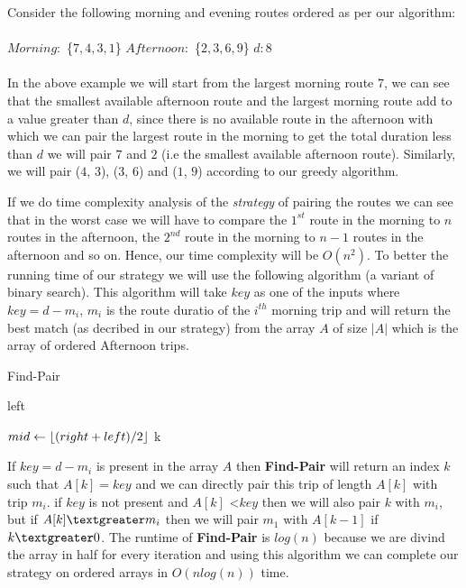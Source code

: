 \documentclass[8pt]{article}
\DeclarePairedDelimiter\floor{\lfloor}{\rfloor}
\begin{document}
Consider the following morning and evening routes ordered as per our algorithm: \\ \\
$Morning:$ \{$7,4,3,1$\} $Afternoon:$ \{$2,3,6,9$\} $d:8$ \\ \\
In the above example we will start from the largest morning route $7$, we can see that the smallest available afternoon route and the largest morning route add to a value greater than $d$, since there is no available route in the afternoon with which we can pair the largest route in the morning to get the total duration less than $d$ we will pair $7$ and $2$ (i.e the smallest available afternoon route). Similarly, we will pair ($4$, $3$), ($3$, $6$) and ($1$, $9$) according to our greedy algorithm.

If we do time complexity analysis of the \textit{strategy} of pairing the routes we can see that in the worst case we will have to compare the $1^{st}$ route in the morning to $n$ routes in the afternoon, the $2^{nd}$ route in the morning to $n - 1$ routes in the afternoon and so on. Hence, our time complexity will be $O(n^2)$. To better the running time of our strategy we will use the following algorithm (a variant of binary search). This algorithm will take $key$ as one of the inputs where $key = d - m_i$, $m_i$ is the route duratio of the $i^{th}$ morning trip and will return the best match (as decribed in our strategy) from the array $A$ of size $\left\vert{A}\right\vert$ which is the array of ordered Afternoon trips.

\begin{algorithm}
\caption{Find-Pair}\label{euclid}
\begin{algorithmic}[1]

    \Return left
\EndIf

\State $mid \leftarrow \floor{(right + left) / 2}$
        \State \Return {}
        \State \Return {}
        \State \Return k
    \EndIf
\EndProcedure
\end{algorithmic}
\end{algorithm}

If $key = d - m_i$ is present in the array $A$ then \textbf{Find-Pair} will return an index $k$ such that $A[k] = key$ and we can directly pair this trip of length $A[k]$ with trip $m_i$. if $key$ is not present and $A[k]$ \textless $key$ then we will also pair $k$ with $m_i$, but if $A[k] \textgreater m_i$ then we will pair $m_1$ with $A[k-1]$ if $k \textgreater 0$. The runtime of \textbf{Find-Pair} is $log(n)$ because we are divind the array in half for every iteration and using this algorithm we can complete our strategy on ordered arrays in $O(nlog(n))$ time.
\end{document}
